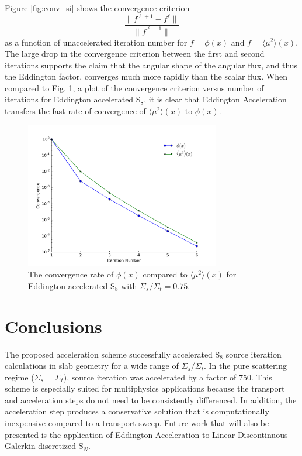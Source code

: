\documentclass{anstrans}
\newcommand{\SN}{S$_N$\xspace}
\newcommand{\edd}{\langle \mu^2 \rangle}
\begin{document}
	Figure \ref{fig:conv_si} shows the convergence criterion 
		\begin{equation}
			\frac{\|f^{\ell+1} - f^{\ell}\|}{\|f^{\ell+1}\|}
		\end{equation}
	as a function of unaccelerated iteration number for $f = \phi(x)$ and $f = \edd(x)$. The large drop in the convergence criterion between the first and second iterations supports the claim that the angular shape of the angular flux, and thus the Eddington factor, converges much more rapidly than the scalar flux. When compared to Fig. \ref{fig:conv_edd}, a plot of the convergence criterion versus number of iterations for Eddington accelerated S$_8$, it is clear that Eddington Acceleration transfers the fast rate of convergence of $\edd(x)$ to $\phi(x)$. 

	\begin{figure}
		\centering
		\includegraphics[width=8.5cm]{eddCon_mu.pdf}
		\caption{The convergence rate of $\phi(x)$ compared to $\edd(x)$ for Eddington accelerated S$_8$ with $\Sigma_s/\Sigma_t = 0.75$. }
		\label{fig:conv_edd}
	\end{figure}


\section{Conclusions}
	The proposed acceleration scheme successfully accelerated S$_8$ source iteration calculations in slab geometry for a wide range of $\Sigma_s/\Sigma_t$. In the pure scattering regime ($\Sigma_s = \Sigma_t$), source iteration was accelerated by a factor of 750. This scheme is especially suited for multiphysics applications because the transport and acceleration steps do not need to be consistently differenced. In addition, the acceleration step produces a conservative solution that is computationally inexpensive compared to a transport sweep. Future work that will also be presented is the application of Eddington Acceleration to Linear Discontinuous Galerkin discretized \SN. 




\end{document}
